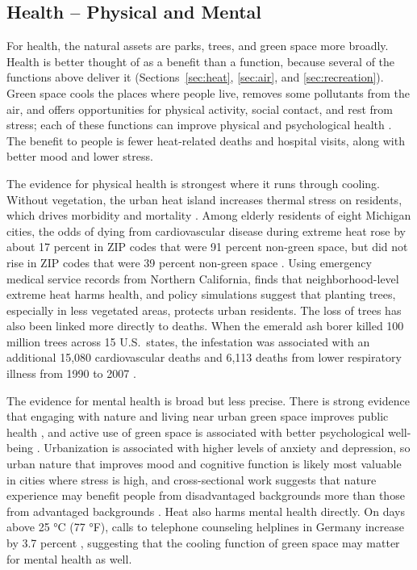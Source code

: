 \documentclass[12pt]{article}
\begin{document}
\subsection{Health -- Physical and Mental}\label{sec:health}

For health, the natural assets are parks, trees, and green space more broadly. Health is better thought of as a benefit than a function, because several of the functions above deliver it (Sections~\ref{sec:heat}, \ref{sec:air}, and \ref{sec:recreation}). Green space cools the places where people live, removes some pollutants from the air, and offers opportunities for physical activity, social contact, and rest from stress; each of these functions can improve physical and psychological health \citep{jenningsApproachingEnvironmentalHealth2015, keelerSocialecologicalTechnologicalFactors2019}. The benefit to people is fewer heat-related deaths and hospital visits, along with better mood and lower stress.

The evidence for physical health is strongest where it runs through cooling. Without vegetation, the urban heat island increases thermal stress on residents, which drives morbidity and mortality \citep{wongGreeneryMitigationAdaptation2021}. Among elderly residents of eight Michigan cities, the odds of dying from cardiovascular disease during extreme heat rose by about 17 percent in ZIP codes that were 91 percent non-green space, but did not rise in ZIP codes that were 39 percent non-green space \citep{gronlundVulnerabilityExtremeHeat2015}. Using emergency medical service records from Northern California, \citet{bianMicroclimatesMatterHealth2025} finds that neighborhood-level extreme heat harms health, and policy simulations suggest that planting trees, especially in less vegetated areas, protects urban residents. The loss of trees has also been linked more directly to deaths. When the emerald ash borer killed 100 million trees across 15 U.S.\ states, the infestation was associated with an additional 15,080 cardiovascular deaths and 6,113 deaths from lower respiratory illness from 1990 to 2007 \citep{donovanRelationshipTreesHuman2013}.

The evidence for mental health is broad but less precise. There is strong evidence that engaging with nature and living near urban green space improves public health \citep{mcphearsonGlobalSynthesisRegional2025}, and active use of green space is associated with better psychological well-being \citep{jenningsApproachingEnvironmentalHealth2015}. Urbanization is associated with higher levels of anxiety and depression, so urban nature that improves mood and cognitive function is likely most valuable in cities where stress is high, and cross-sectional work suggests that nature experience may benefit people from disadvantaged backgrounds more than those from advantaged backgrounds \citep{keelerSocialecologicalTechnologicalFactors2019}. Heat also harms mental health directly. On days above 25 °C (77 °F), calls to telephone counseling helplines in Germany increase by 3.7 percent \citep{janzenTemperatureMentalHealth2025}, suggesting that the cooling function of green space may matter for mental health as well.
\end{document}
